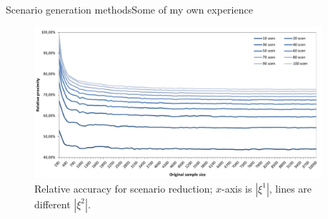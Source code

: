 \begin{frame}{Scenario generation methods}{Some of my own experience}
	\begin{figure}
		\includegraphics[width=0.95\textwidth]{figures/scenred.pdf}
		\caption{Relative accuracy for scenario reduction; $x$-axis is $|\xi^1|$, lines are different $|\xi^2|$. \cite{oliveira2016framework}}	
	\end{figure}

\end{frame}

